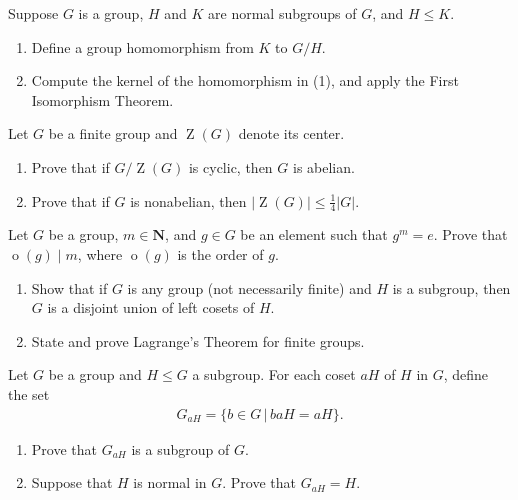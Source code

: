 \documentclass[11pt,twoside,openany]{memoir}
\begin{document}
        \begin{exercise}
        Suppose $G$ is a group, $H$ and $K$ are normal subgroups of $G$, and $H\le K$.
        \begin{enumerate}[label = (\arabic*)]
            \item Define a group homomorphism from $K$ to $G/H$.
            \item Compute the kernel of the homomorphism in (1), and apply the First Isomorphism Theorem.
        \end{enumerate}
        \end{exercise}
        
        \begin{exercise}
        Let $G$ be a finite group and $\operatorname{Z}(G)$ denote its center.
        \begin{enumerate}[label = (\arabic*)]
            \item Prove that if $G/\operatorname{Z}(G)$ is cyclic, then $G$ is abelian.
            \item Prove that if $G$ is nonabelian, then $|\operatorname{Z}(G)|\le \frac{1}{4}|G|$.
        \end{enumerate}
        \end{exercise}
        
        \begin{exercise}
        Let $G$ be a group, $m\in \mathbf{N}$, and $g\in G$ be an element such that $g^m=e$. Prove that $\operatorname{o}(g)\mid m$, where $\operatorname{o}(g)$ is the order of $g$.
        \end{exercise}
        
        \begin{exercise}
            \phantom{a}
        \begin{enumerate}[label = (\arabic*)]
            \item Show that if $G$ is any group (not necessarily finite) and $H$ is a subgroup, then $G$ is a disjoint union of left cosets of $H$.
            \item State and prove Lagrange's Theorem for finite groups.
        \end{enumerate}
        \end{exercise}
        
        \begin{exercise}
        Let $G$ be a group and $H\le G$ a subgroup. For each coset $aH$ of $H$ in $G$, define the set
        \begin{equation*}
        \begin{split}
        G_{aH}=\{b\in G\,|\, baH=aH\}.
        \end{split}
        \end{equation*}
        \begin{enumerate}[label = (\arabic*)]
            \item Prove that $G_{aH}$ is a subgroup of $G$.
            \item Suppose that $H$ is normal in $G$. Prove that $G_{aH}=H$.
        \end{enumerate}
        \end{exercise}
        
\end{document}

